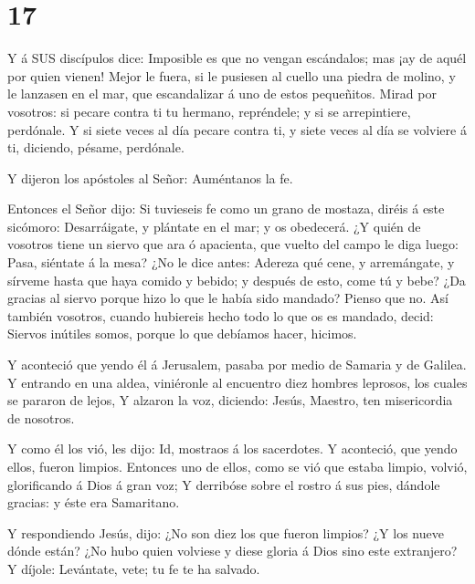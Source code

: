 \hypertarget{section-16}{%
\section{17}\label{section-16}}

 Y á SUS discípulos dice: Imposible es que no vengan
escándalos; mas ¡ay de aquél por quien vienen!  Mejor le
fuera, si le pusiesen al cuello una piedra de molino, y le lanzasen en
el mar, que escandalizar á uno de estos pequeñitos.  Mirad
por vosotros: si pecare contra ti tu hermano, repréndele; y si se
arrepintiere, perdónale.  Y si siete veces al día pecare
contra ti, y siete veces al día se volviere á ti, diciendo, pésame,
perdónale.

 Y dijeron los apóstoles al Señor: Auméntanos la fe.

 Entonces el Señor dijo: Si tuvieseis fe como un grano de
mostaza, diréis á este sicómoro: Desarráigate, y plántate en el mar; y
os obedecerá.  ¿Y quién de vosotros tiene un siervo que ara
ó apacienta, que vuelto del campo le diga luego: Pasa, siéntate á la
mesa?  ¿No le dice antes: Adereza qué cene, y arremángate, y
sírveme hasta que haya comido y bebido; y después de esto, come tú y
bebe?  ¿Da gracias al siervo porque hizo lo que le había
sido mandado? Pienso que no.  Así también vosotros, cuando
hubiereis hecho todo lo que os es mandado, decid: Siervos inútiles
somos, porque lo que debíamos hacer, hicimos.

 Y aconteció que yendo él á Jerusalem, pasaba por medio de
Samaria y de Galilea.  Y entrando en una aldea, viniéronle
al encuentro diez hombres leprosos, los cuales se pararon de lejos,
 Y alzaron la voz, diciendo: Jesús, Maestro, ten
misericordia de nosotros.

 Y como él los vió, les dijo: Id, mostraos á los
sacerdotes. Y aconteció, que yendo ellos, fueron limpios. 
Entonces uno de ellos, como se vió que estaba limpio, volvió,
glorificando á Dios á gran voz;  Y derribóse sobre el
rostro á sus pies, dándole gracias: y éste era Samaritano.

 Y respondiendo Jesús, dijo: ¿No son diez los que fueron
limpios? ¿Y los nueve dónde están?  ¿No hubo quien volviese
y diese gloria á Dios sino este extranjero?  Y díjole:
Levántate, vete; tu fe te ha salvado.

